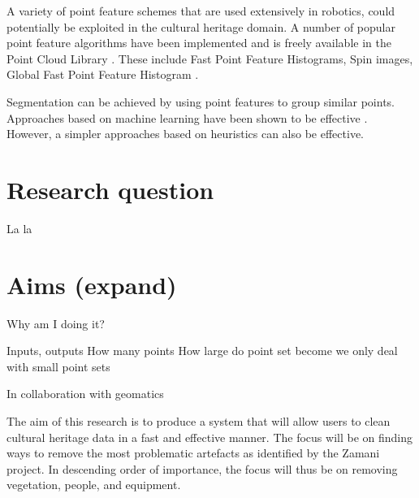 \documentclass[10pt,twocolumn]{article}
\begin{document}




A variety of point feature schemes that are used extensively in robotics, could potentially be exploited in the cultural heritage domain. A number of popular point feature algorithms have been implemented and is freely available in the Point Cloud Library \cite{Rusu2011}. These include Fast Point Feature Histograms, Spin images, Global Fast Point Feature Histogram \cite{Rusu2011}.

Segmentation can be achieved by using point features to group similar points. Approaches based on machine learning have been shown to be effective \cite{Shapovalov2010,Rusu2009}. However, a simpler approaches based on heuristics \cite{Spina2010} can also be effective.


\section{Research question}
La la

\section{Aims (expand)}
Why am I doing it?

Inputs, outputs
How many points
How large do point set become
we only deal with small point sets



In collaboration with geomatics

The aim of this research is to produce a system that will allow users to clean cultural heritage data in a fast and effective manner. The focus will be on finding ways to remove the most problematic artefacts as identified by the Zamani project. In descending order of importance, the focus will thus be on removing vegetation, people, and equipment. 
\end{document}
